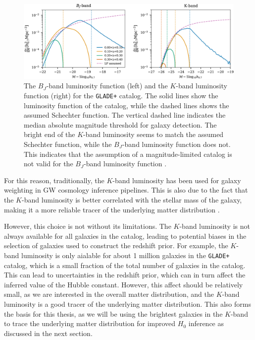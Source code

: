 \begin{figure}[h!]
    \centering
    \includegraphics[width=\textwidth]{figures/apjac74bbf15_hr.jpg}
    \caption[The $B_J$-band luminosity function and the $K$-band luminosity function for the \texttt{GLADE+} catalog.]{The $B_J$-band luminosity function (left) and the $K$-band luminosity function (right) for the \texttt{GLADE+} catalog. The solid lines show the luminosity function of the catalog, while the dashed lines shows the assumed Schechter function. The vertical dashed line indicates the median absolute magnitude threshold for galaxy detection. The bright end of the $K$-band luminosity seems to match the assumed Schechter function, while the $B_J$-band luminosity function does not. This indicates that the assumption of a magnitude-limited catalog is not valid for the $B_J$-band luminosity function \citep{abbott2023constraints}.}
    \label{fig:luminosity_function}
\end{figure}

For this reason, traditionally, the $K$-band luminosity has been used for galaxy weighting in \ac{GW} cosmology inference pipelines. This is also due to the fact that the $K$-band luminosity is better correlated with the stellar mass of the galaxy, making it a more reliable tracer of the underlying matter distribution \citep{strazzullo2006near,sureshkumar2021galaxy,abbott2023constraints}. 

However, this choice is not without its limitations. The $K$-band luminosity is not always available for all galaxies in the catalog, leading to potential biases in the selection of galaxies used to construct the redshift prior. For example, the $K$-band luminosity is only aialable for about 1 million galaxies in the \texttt{GLADE+} catalog, which is a small fraction of the total number of galaxies in the catalog. This can lead to uncertainties in the redshift prior, which can in turn affect the inferred value of the Hubble constant. However, this affect should be relatively small, as we are interested in the overall matter distribution, and the $K$-band luminosity is a good tracer of the underlying matter distribution. This also forms the basis for this thesis, as we will be using the brightest galaxies in the $K$-band to trace the underlying matter distribution for improved $H_0$ inference as discussed in the next section.

